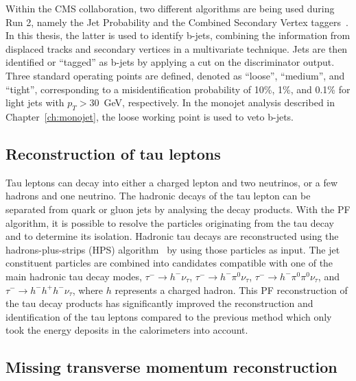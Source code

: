 Within the \ac{CMS} collaboration, two different algorithms are being used during Run 2, namely the Jet Probability and the Combined Secondary Vertex taggers~\cite{Chatrchyan:2012jua}. In this thesis, the latter is used to identify b-jets, combining the information from displaced tracks and secondary vertices in a multivariate technique. Jets are then identified or ``tagged'' as b-jets by applying a cut on the discriminator output. Three standard operating points are defined, denoted as ``loose'', ``medium'', and ``tight'', corresponding to a misidentification probability of 10\%, 1\%, and 0.1\% for light jets with $p_T > 30$~GeV, respectively. In the monojet analysis described in Chapter~\ref{ch:monojet}, the loose working point is used to veto b-jets.
\subsection{Reconstruction of tau leptons}
\label{sec:tauID}

Tau leptons can decay into either a charged lepton and two neutrinos, or a few hadrons and one neutrino. The hadronic decays of the tau lepton can be separated from quark or gluon jets by analysing the decay products. With the \ac{PF} algorithm, it is possible to resolve the particles originating from the tau decay and to determine its isolation. Hadronic tau decays are reconstructed using the hadrons-plus-strips (HPS) algorithm~\cite{Khachatryan:2015dfa} by using those particles as input. The jet constituent particles are combined into candidates compatible with one of the main hadronic tau decay modes, $\tau^- \rightarrow h^- \nu_{\tau}$, $\tau^- \rightarrow h^- \pi^0 \nu_{\tau}$, $\tau^- \rightarrow h^- \pi^0 \pi^0 \nu_{\tau}$, and $\tau^- \rightarrow h^- h^+ h^- \nu_{\tau}$, where $h$ represents a charged hadron. This \ac{PF} reconstruction of the tau decay products has significantly improved the reconstruction and identification of the tau leptons compared to the previous method which only took the energy deposits in the calorimeters into account.

\subsection{Missing transverse momentum reconstruction}
\label{sec:MET}

